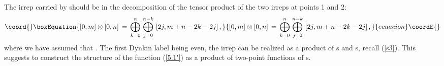 \documentclass[a4paper,11pt]{article}
\begin{document}
The \coordHE{} irrep carried by \coordHE{} should be in the
decomposition of the tensor product of the two irreps at points 1 and 2:
\begin{equation}\coord{}\boxEquation{\label{5.2}
[0,m] \otimes [0,n] \, = \, \bigoplus_{k=0}^n \, \bigoplus_{j=0}^{n-k} \, \,
[2j, m+n - 2k -2j] \, ,
}{[0,m] \otimes [0,n] \, = \, \bigoplus_{k=0}^n \, \bigoplus_{j=0}^{n-k} \, \,
[2j, m+n - 2k -2j] \, ,
}{ecuacion}\coordE{}\end{equation}
where we have assumed that \coordHE{}. The first Dynkin label being even, the
irrep \myHighlight{$[2j,p]$}\coordHE{} can be realized as a product of \coordHE{}s and  \coordHE{}s,
recall (\ref{s3}). This suggests to construct the \coordHE{} structure of
the function (\ref{5.1'}) as a product of two-point functions of \coordHE{}s.
\end{document}
